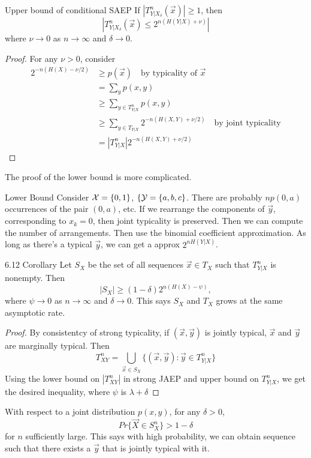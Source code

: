 \documentclass[../main.tex]{subfiles}
\begin{document}
\begin{bbox}{Upper bound of conditional SAEP}
   If $|T^n_{Y|X_\delta}(\vec x)|\geq 1$, then \[
   |T^n_{Y|X_\delta}(\vec x)\leq 2^{n(H(Y|X)+\nu)}|
   \] where $\nu\to 0$ as $n\to \infty$ and $\delta\to 0$.
   \begin{proof}
       For any $\nu >0$, consider \begin{align*}
          2^{-n(H(X)-\nu/2)}&\geq p(\vec x) \quad \text{by typicality of $\vec x$}\\
          &=\sum_y p(x,y)\\
          &\geq \sum_{y\in T^n_{Y|X}}p(x,y)
           \\
          &\geq \sum_{y\in T_{Y|X}} 2^{-n(H(X,Y)+\nu/2)} \quad\text{by joint typicality}\\
          &=|T^n_{Y|X}| 2^{-n(H(X,Y)+\nu/2)}
       \end{align*}
   \end{proof}
\end{bbox}
The proof of the lower bound is more complicated.
\begin{pbox}{Lower Bound}
    Consider $\mathcal{X}=\{0,1\}$, $\{\mathcal{Y}=\{a,b,c\}$.
    There are probably $n p(0,a)$ occurrences of the pair $(0,a)$, etc. If we rearrange the components of $\vec y$, corresponding to $x_k=0$, then joint typicality is preserved. Then we can compute the number of arrangements. Then use the binomial coefficient approximation. As long as there's a typical $\vec y$, we can get a approx $2^{nH(Y|X)}$.
\end{pbox}
\begin{bbox}{6.12 Corollary}
    Let $S_X$ be the set of all sequences $\vec x\in T_X$ such that $T^n_{Y|X}$ is nonempty. Then \[
    |S_X|\geq (1-\delta)2^{n(H(X)-\psi)},
    \] where $\psi\to 0$ as $n\to \infty$ and $\delta\to 0$.
    This says $S_X$ and $T_X$ grows at the same asymptotic rate.
    \begin{proof}
        By consistentcy of strong typicality, if $(\vec x,\vec y)$ is jointly typical, $\vec x$ and $\vec y$ are marginally typical. Then \[T^n_{XY}=\bigcup_{\vec x\in S_X}\{(\vec x,\vec y):\vec y\in T^n_{Y|X}\}
        \]
        Using the lower bound on $|T^n_{XY}|$ in strong JAEP and upper bound on $T^n_{Y|X}$, we get the desired inequality, where $\psi$ is $\lambda + \delta$
    \end{proof}
    \begin{proposition*}
        With respect to a joint distribution $p(x,y)$, for any $\delta>0$,\[
        Pr\{\vec X\in S^{n}_X\} > 1-\delta
        \] for $n$ sufficiently large.
        \newline
        This says with high probability, we can obtain sequence such that there exists a $\vec y$ that is jointly typical with it. \end{proposition*}
\end{bbox}
\end{document}

